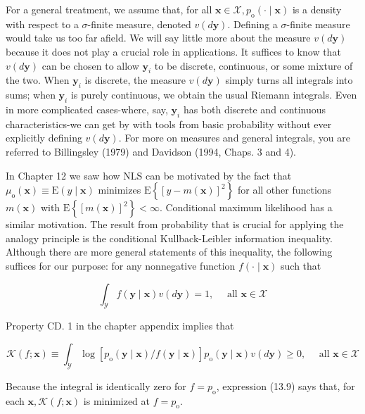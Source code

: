 \documentclass[10pt]{article}
\begin{document}
For a general treatment, we assume that, for all $\mathbf{x} \in \mathscr{X}, p_{\mathrm{o}}(\cdot \mid \mathbf{x})$ is a density with respect to a $\sigma$-finite measure, denoted $v(d \mathbf{y})$. Defining a $\sigma$-finite measure would take us too far afield. We will say little more about the measure $v(d \mathbf{y})$ because it does not play a crucial role in applications. It suffices to know that $v(d \mathbf{y})$ can be chosen to allow $\mathbf{y}_{i}$ to be discrete, continuous, or some mixture of the two. When $\mathbf{y}_{i}$ is discrete, the measure $v(d \mathbf{y})$ simply turns all integrals into sums; when $\mathbf{y}_{i}$ is purely continuous, we obtain the usual Riemann integrals. Even in more complicated cases-where, say, $\mathbf{y}_{i}$ has both discrete and continuous characteristics-we can get by with tools from basic probability without ever explicitly defining $v(d \mathbf{y})$. For more on measures and general integrals, you are referred to Billingsley (1979) and Davidson (1994, Chaps. 3 and 4).

In Chapter 12 we saw how NLS can be motivated by the fact that $\mu_{\mathrm{o}}(\mathbf{x}) \equiv \mathrm{E}(y \mid \mathbf{x})$ minimizes $\mathrm{E}\left\{[y-m(\mathbf{x})]^{2}\right\}$ for all other functions $m(\mathbf{x})$ with $\mathrm{E}\left\{[m(\mathbf{x})]^{2}\right\}<\infty$. Conditional maximum likelihood has a similar motivation. The result from probability that is crucial for applying the analogy principle is the conditional Kullback-Leibler information inequality. Although there are more general statements of this inequality, the following suffices for our purpose: for any nonnegative function $f(\cdot \mid \mathbf{x})$ such that


\begin{equation*}
\int_{\mathscr{Y}} f(\mathbf{y} \mid \mathbf{x}) v(d \mathbf{y})=1, \quad \text { all } \mathbf{x} \in \mathscr{X} \tag{13.8}
\end{equation*}


Property CD. 1 in the chapter appendix implies that


\begin{equation*}
\mathscr{K}(f ; \mathbf{x}) \equiv \int_{\mathscr{Y}} \log \left[p_{\mathrm{o}}(\mathbf{y} \mid \mathbf{x}) / f(\mathbf{y} \mid \mathbf{x})\right] p_{\mathrm{o}}(\mathbf{y} \mid \mathbf{x}) v(d \mathbf{y}) \geq 0, \quad \text { all } \mathbf{x} \in \mathscr{X} \tag{13.9}
\end{equation*}


Because the integral is identically zero for $f=p_{\mathrm{o}}$, expression (13.9) says that, for each $\mathbf{x}, \mathscr{K}(f ; \mathbf{x})$ is minimized at $f=p_{\mathrm{o}}$.
\end{document}
